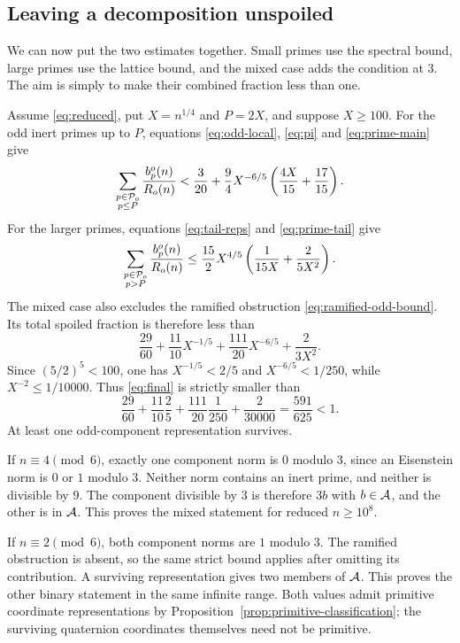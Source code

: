 \subsection{Leaving a decomposition unspoiled}\label{sec:infinite}
We can now put the two estimates together. Small primes use the spectral
bound, large primes use the lattice bound, and the mixed case adds the
condition at $3$. The aim is simply to make their combined fraction less
than one.

Assume \eqref{eq:reduced}, put $X=n^{1/4}$ and $P=2X$, and suppose
$X\ge100$. For the odd inert primes up to $P$, equations
\eqref{eq:odd-local}, \eqref{eq:pi} and \eqref{eq:prime-main} give
\[
\sum_{\substack{p\in\PP_o\\p\le P}}\frac{b_p^o(n)}{R_o(n)}
<\frac3{20}+\frac94 X^{-6/5}
\left(\frac{4X}{15}+\frac{17}{15}\right).
\]
For the larger primes, equations \eqref{eq:tail-reps} and
\eqref{eq:prime-tail} give
\[
\sum_{\substack{p\in\PP_o\\p>P}}\frac{b_p^o(n)}{R_o(n)}
\le\frac{15}{2}X^{4/5}
\left(\frac1{15X}+\frac2{5X^2}\right).
\]
The mixed case also excludes the ramified obstruction
\eqref{eq:ramified-odd-bound}. Its total spoiled fraction is therefore
less than
\begin{equation}\label{eq:final}
\frac{29}{60}+\frac{11}{10}X^{-1/5}
+\frac{111}{20}X^{-6/5}+\frac{2}{3X^2}.
\end{equation}
Since $(5/2)^5<100$, one has $X^{-1/5}<2/5$ and
$X^{-6/5}<1/250$, while $X^{-2}\le1/10000$. Thus \eqref{eq:final} is
strictly smaller than
\[
\frac{29}{60}+\frac{11}{10}\frac25+
\frac{111}{20}\frac1{250}+\frac2{30000}
=\frac{591}{625}<1.
\]
At least one odd-component representation survives.

If $n\equiv4\pmod6$, exactly one component norm is $0$ modulo $3$,
since an Eisenstein norm is $0$ or $1$ modulo $3$. Neither norm contains
an inert prime, and neither is divisible by $9$. The component divisible
by $3$ is therefore $3b$ with $b\in\AA$, and the other is in $\AA$.
This proves the mixed statement for reduced $n\ge10^8$.

If $n\equiv2\pmod6$, both component norms are $1$ modulo $3$.
The ramified obstruction is absent, so the same strict bound applies
after omitting its contribution. A surviving representation gives two
members of $\AA$. This proves the other binary statement in the same
infinite range. Both values admit primitive coordinate representations
by Proposition~\ref{prop:primitive-classification}; the surviving
quaternion coordinates themselves need not be primitive.
